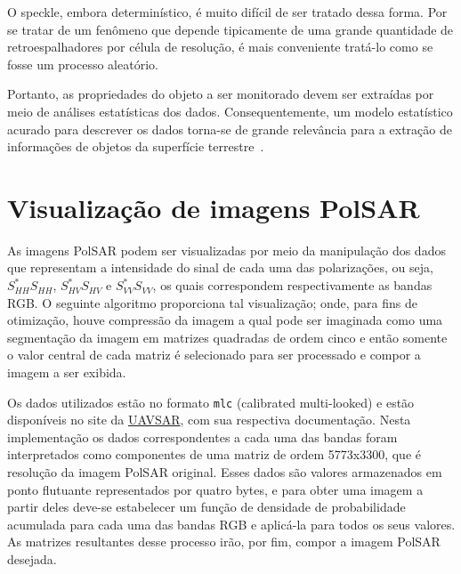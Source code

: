 \documentclass[12pt]{article}
\begin{document}
O speckle, embora determinístico, é muito difícil de ser tratado dessa forma.
Por se tratar de um fenômeno que depende tipicamente de uma grande quantidade de retroespalhadores por célula de resolução, é mais conveniente tratá-lo como se fosse um processo aleatório.

Portanto, as propriedades do objeto a ser monitorado devem ser extraídas por meio de análises estatísticas dos dados. 
Consequentemente, um modelo estatístico acurado para descrever os dados torna-se de grande relevância para a extração de informações de objetos da superfície terrestre~\cite{Lee99}.

\newpage

\section{Visualização de imagens PolSAR}
As imagens PolSAR podem ser visualizadas por meio da manipulação dos dados que representam a intensidade do sinal de cada uma das polarizações, ou seja, $S_{HH}^*S_{HH}$, $S_{HV}^*S_{HV}$ e $S_{VV}^*S_{VV}$, 
os quais correspondem respectivamente as bandas RGB. 
O seguinte algoritmo proporciona tal visualização; onde, para fins de otimização, houve compressão da imagem a qual pode ser imaginada como uma segmentação da imagem em matrizes quadradas de ordem cinco e então somente o valor central de cada matriz é selecionado para ser processado e compor a imagem a ser exibida. 

Os dados utilizados estão no formato \texttt{mlc} (calibrated multi-looked) e estão disponíveis no site da \href{https://uavsar.jpl.nasa.gov/cgi-bin/product.pl?jobName=trauns_22551_15087_016_150604_L090_CX_01#data}{UAVSAR}, com sua respectiva documentação. 
Nesta implementação os dados correspondentes a cada uma das bandas foram interpretados como componentes de uma matriz de ordem 5773x3300, 
que é resolução da imagem PolSAR original. 
Esses dados são valores armazenados em ponto flutuante representados por quatro bytes, e para obter uma imagem a partir deles deve-se estabelecer um função de densidade de probabilidade acumulada para cada uma das bandas RGB e aplicá-la para todos os seus valores. 
As matrizes resultantes desse processo irão, por fim, compor a imagem PolSAR desejada. 
\end{document}
